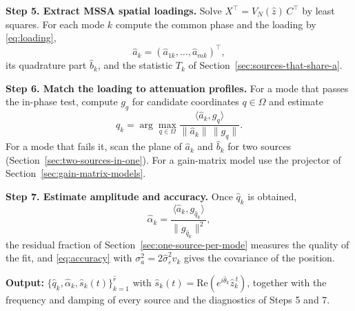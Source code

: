 \documentclass{article}
\begin{document}
\textbf{Step 5. Extract MSSA spatial loadings.} Solve $X^{\top} = V_N(\widehat{z})\, C^{\top}$ by least squares. For each mode $k$ compute the common phase and the loading by \eqref{eq:loading}, \[
\widehat{a}_k = (\widehat{a}_{1k}, \dots, \widehat{a}_{mk})^{\top},
\] its quadrature part $\widehat{b}_k$, and the statistic $T_k$ of Section~\ref{sec:sources-that-share-a}.

\textbf{Step 6. Match the loading to attenuation profiles.} For a mode that passes the in-phase test, compute $g_q$ for candidate coordinates $q \in \Omega$ and estimate \[
\widehat{q}_k = \arg\max_{q \in \Omega} \frac{\langle \widehat{a}_k, g_q \rangle}{\lVert \widehat{a}_k \rVert\, \lVert g_q \rVert}.
\] For a mode that fails it, scan the plane of $\widehat{a}_k$ and $\widehat{b}_k$ for two sources (Section~\ref{sec:two-sources-in-one}). For a gain-matrix model use the projector of Section~\ref{sec:gain-matrix-models}.

\textbf{Step 7. Estimate amplitude and accuracy.} Once $\widehat{q}_k$ is obtained, \[
\widehat{\alpha}_k = \frac{\langle \widehat{a}_k, g_{\widehat{q}_k} \rangle}{\lVert g_{\widehat{q}_k} \rVert^{2}},
\] the residual fraction of Section~\ref{sec:one-source-per-mode} measures the quality of the fit, and \eqref{eq:accuracy} with $\sigma_a^{2} = 2 \widehat{\sigma}_\varepsilon^{2} v_k$ gives the covariance of the position.

\textbf{Output:} $\{\widehat{q}_k, \widehat{\alpha}_k, \widehat{s}_k(t)\}_{k=1}^{\widehat{r}}$ with $\widehat{s}_k(t) = \mathrm{Re}(e^{i\widehat{\theta}_k} \widehat{z}_k^{\,t})$, together with the frequency and damping of every source and the diagnostics of Steps 5 and 7.
\end{document}
